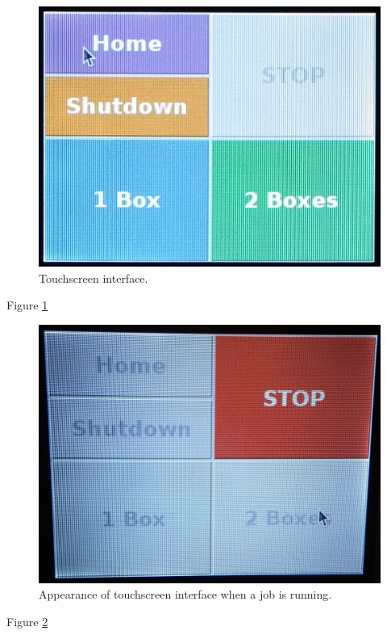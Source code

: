 \documentclass[]{book}
\theoremstyle{definition}
\theoremstyle{definition}
\theoremstyle{remark}
\begin{document}
\begin{figure}

{\centering \includegraphics[width=0.6\linewidth]{images/gui} 

}

\caption{Touchscreen interface.}\label{fig:touchscreen}
\end{figure}

Figure \ref{fig:touchscreen}

\begin{figure}

{\centering \includegraphics[width=0.6\linewidth]{images/gui_stop2} 

}

\caption{Appearance of touchscreen interface when a job is running.}\label{fig:stopRobot}
\end{figure}

Figure \ref{fig:stopRobot}


\end{document}
